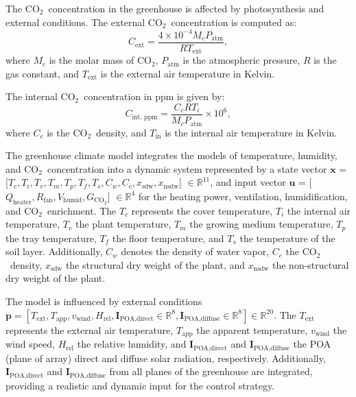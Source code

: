 \documentclass[conference]{IEEEtran}
\newcommand{\coo}{\ensuremath{\mathrm{CO_2}}}
\begin{document}
The \coo\ concentration in the greenhouse is affected by photosynthesis and external conditions. The external \coo\ concentration is computed as:
\begin{equation}
    C_{\text{ext}} = \frac{4 \times 10^{-4}  M_c  P_{\text{atm}}}{R  T_{\text{ext}}},
\end{equation}
where \(M_c\) is the molar mass of \coo, \(P_{\text{atm}}\) is the atmospheric pressure, \(R\) is the gas constant, and \(T_{\text{ext}}\) is the external air temperature in Kelvin.

The internal \coo\ concentration in ppm is given by:
\begin{equation}
    C_{\text{int, ppm}} = \frac{C_c  R  T_i}{M_c  P_{\text{atm}}} \times 10^6,
\end{equation}
where \(C_c\) is the \coo\ density, and \(T_{\text{in}}\) is the internal air temperature in Kelvin.

The greenhouse climate model integrates the models of temperature, humidity, and \coo\ concentration into a dynamic system represented by a state vector \(\mathbf{x}\) = [\(T_c, T_i, T_v, T_m, T_p, T_f, T_s, C_w, C_c, x_{\text{sdw}}, x_{\text{nsdw}}\)] \( \in\mathbb R^{11} \), and input vector \(\mathbf{u}\) = [\(Q_{\text{heater}}, R_{\text{fan}}, V_{\text{humid}}, G_{\coo} \)] \( \in\mathbb R^{4} \) for the heating power, ventilation, humidification, and \coo\ enrichment. The \(T_c\) represents the cover temperature, \(T_i\) the internal air temperature, \(T_v\) the plant temperature, \(T_m\) the growing medium temperature, \(T_p\) the tray temperature, \(T_f\) the floor temperature, and \(T_s\) the temperature of the soil layer. Additionally, \(C_w\) denotes the density of water vapor, \(C_c\) the \coo\ density, \(x_{\text{sdw}}\) the structural dry weight of the plant, and \(x_{\text{nsdw}}\) the non-structural dry weight of the plant.

The model is influenced by external conditions \( \mathbf{p} = \left[
T_{\text{ext}}, T_{\text{app}}, v_{\text{wind}}, H_{\text{rel}}, \mathbf{I}_{\text{POA,direct}}\in \mathbb{R}^{8}, \mathbf{I}_{\text{POA,diffuse}}\in \mathbb{R}^{8}
\right] \in \mathbb{R}^{20} \). The \(T_{\text{ext}}\) represents the external air temperature, \(T_{\text{app}}\) the apparent temperature, \(v_{\text{wind}}\) the wind speed, \(H_{\text{rel}}\) the relative humidity, and \(\mathbf{I}_{\text{POA,direct}}\) and \(\mathbf{I}_{\text{POA,diffuse}}\) the POA (plane of array) direct and diffuse solar radiation, respectively. Additionally, \(\mathbf{I}_{\text{POA,direct}}\) and \(\mathbf{I}_{\text{POA,diffuse}}\) from all planes of the greenhouse are integrated, providing a realistic and dynamic input for the control strategy.
\end{document}
